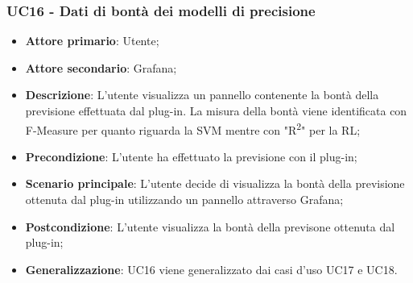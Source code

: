\subsubsection{UC16 - Dati di bontà dei modelli di precisione}
\label{sssec:uc16}
\begin{itemize}
  \item \textbf{Attore primario}: Utente;
  \item \textbf{Attore secondario}: Grafana;
  \item \textbf{Descrizione}: L'utente visualizza un pannello contenente la bontà della previsione effettuata dal plug-in. La misura della bontà viene identificata con F-Measure per quanto riguarda la SVM mentre con "R\textsuperscript{2}" per la RL;
  \item \textbf{Precondizione}: L'utente ha effettuato la previsione con il plug-in;
  \item \textbf{Scenario principale}: L'utente decide di visualizza la bontà della previsione ottenuta dal plug-in utilizzando un pannello attraverso Grafana;
  \item \textbf{Postcondizione}: L'utente visualizza la bontà della previsone ottenuta dal plug-in;
  \item \textbf{Generalizzazione}: UC16 viene generalizzato dai casi d'uso UC17 e UC18.
\end{itemize}
